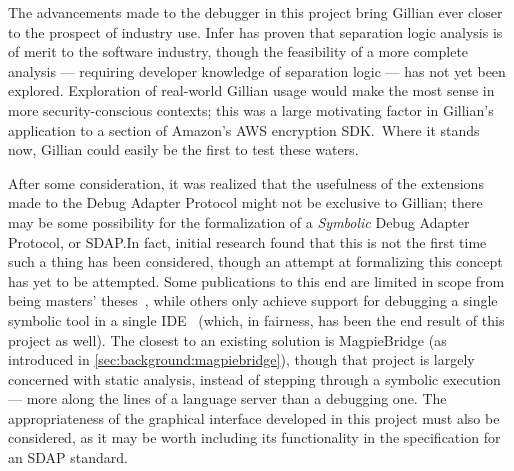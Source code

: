 The advancements made to the debugger in this project bring Gillian ever closer
to the prospect of industry use. Infer has proven that separation logic analysis
is of merit to the software industry, though the feasibility of a more complete
analysis --- requiring developer knowledge of separation logic --- has not yet
been explored. Exploration of real-world Gillian usage would make the most sense
in more security-conscious contexts; this was a large motivating factor in
Gillian's application to a section of Amazon's AWS encryption SDK.\ Where it
stands now, Gillian could easily be the first to test these waters.

After some consideration, it was realized that the usefulness of the extensions
made to the Debug Adapter Protocol might not be exclusive to Gillian; there may
be some possibility for the formalization of a \textit{Symbolic} Debug Adapter
Protocol, or SDAP.\@ In fact, initial research found that this is not the first
time such a thing has been considered, though an attempt at formalizing this
concept has yet to be attempted. Some publications to this end are limited in
scope from being masters' theses~\cite{sdap-arxiv, sdap-aurecchia}, while others
only achieve support for debugging a single symbolic tool in a single
IDE~\cite{sdap-colombo, sdap-kps} (which, in fairness, has been the end result
of this project as well).
The closest to an existing solution is MagpieBridge (as introduced in
\autoref{sec:background:magpiebridge}), though that project is largely concerned
with static analysis, instead of stepping through a symbolic execution --- more
along the lines of a language server than a debugging one.
The appropriateness of the graphical interface developed in this project must
also be considered, as it may be worth including its functionality in the
specification for an SDAP standard.

